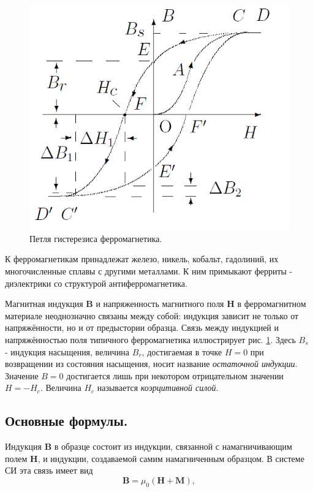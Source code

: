 \documentclass[a4paper, 12pt, twoside]{article}
\begin{document}
\begin{figure} 
	
	\includegraphics[width=\linewidth]{gist}
	\caption{Петля гистерезиса ферромагнетика.}
	\label{gist}
\end{figure}
К ферромагнетикам принадлежат железо, никель, кобальт, гадолиний, их многочисленные сплавы с другими металлами. К ним примыкают ферриты - диэлектрики со структурой антиферромагнетика.

Магнитная индукция \textbf{B} и напряженность магнитного поля \textbf{H} в ферромагнитном материале неоднозначно связаны между собой: индукция зависит не только от напряжённости, но и от предыстории образца. Связь между индукцией и напряжённостью поля типичного ферромагнетика иллюстрирует рис. \ref{gist}.
Здесь $B_s$ - индукция насыщения, величина $B_r$, достигаемая в точке $H = 0$ при возвращении из состояния насыщения, носит название \textit{остаточной индукции}. Значение $B = 0$ достигается лишь при некотором отрицательном значении $H = -H_c$. Величина $H_c$ называется \textit{коэрцитивной силой}.



\subsection{Основные формулы.}

Индукция \textbf{B} в образце состоит из индукции, связанной с намагничивающим полем \textbf{H}, и индукции, создаваемой самим намагниченным образцом. В системе СИ эта связь имеет вид
\begin{equation}
\textbf{B} = \mu_0(\textbf{H} + \textbf{M}),
\label{f1}
\end{equation}
\end{document}

